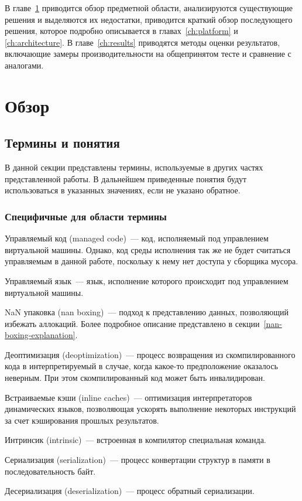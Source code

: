 \documentclass[times
]{itmo-student-thesis}
\begin{document}
В главе~\ref{ch:overview} приводится обзор предметной области, анализируются существующие решения и выделяются их недостатки, приводится краткий обзор последующего решения, которое подробно описывается в главах~\ref{ch:platform} и \ref{ch:architecture}. В главе~\ref{ch:results} приводятся методы оценки результатов, включающие замеры производительности на общепринятом тесте и сравнение с аналогами.

\chapter{Обзор}\label{ch:overview}

\startrelatedwork

\section{Термины и понятия}
В данной секции представлены термины, используемые в других частях представленной работы. В дальнейшем приведенные понятия будут использоваться в указанных значениях, если не указано обратное.
\def\MakeTerm#1#2{#1~--- #2.\par}
\subsection{Специфичные для области термины}
	\MakeTerm{Управляемый код (managed code)}{код, исполняемый под управлением виртуальной машины. Однако, код среды исполнения так же не будет считаться управляемым в данной работе, поскольку к нему нет доступа у сборщика мусора}
	\MakeTerm{Управляемый язык}{язык, исполнение которого происходит под управлением виртуальной машины}
	\MakeTerm{NaN упаковка (nan boxing)}{подход к представлению данных, позволяющий избежать аллокаций. Более подробное описание представлено в секции~\ref{nan-boxing-explanation}}
	\MakeTerm{Деоптимизация (deoptimization)}{процесс возвращения из скомпилированного кода в интерпретируемый в случае, когда какое-то предположение оказалось неверным. При этом скомпилированный код может быть инвалидирован}
	\MakeTerm{Встраиваемые кэши (inline caches)}{оптимизация интерпретаторов динамических языков, позволяющая ускорять выполнение некоторых инструкций за счет кэширования прошлых результатов}
	\MakeTerm{Интринсик (intrinsic)}{встроенная в компилятор специальная команда}
	\MakeTerm{Сериализация (serialization)}{процесс конвертации структур в памяти в последовательность байт}
	\MakeTerm{Десериализация (deserialization)}{процесс обратный сериализации}
\end{document}
